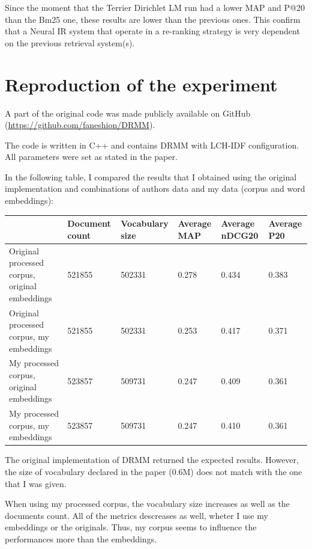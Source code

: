 Since the moment that the Terrier Dirichlet LM run had a lower MAP and P@20 than the Bm25 one, these results are lower than the previous ones. This confirm that a Neural IR system that operate in a re-ranking strategy is very dependent on the previous retrieval system(s).

\section{Reproduction of the experiment}

A part of the original code was made publicly available on GitHub (\url{https://github.com/faneshion/DRMM}).

The code is written in C++ and contains DRMM with LCH-IDF configuration. All parameters were set as stated in the paper.

In the following table, I compared the results that I obtained using the original implementation and combinations of authors data and my data (corpus and word embeddings):

\begin{adjustbox}{center, caption={Replication of the original experiments (extended with my data)}, nofloat=table}
\centering
\begin{tabular}{p{5cm}p{1.7cm}p{2cm}p{1.3cm}p{1.3cm}p{1.3cm}} 
 \hline
 & Document count & Vocabulary size & Average MAP & Average nDCG\@20 & Average P\@20 \\
 \hline
 Original processed corpus, original embeddings & 521855 & 502331 & 0.278 & 0.434 & 0.383 \\ 
 Original processed corpus, my embeddings & 521855 & 502331 & 0.253 & 0.417 & 0.371 \\
 My processed corpus, original embeddings & 523857 & 509731 & 0.247 & 0.409 & 0.361 \\
 My processed corpus, my embeddings & 523857 & 509731 & 0.247 & 0.410 & 0.361 \\
 \hline
\end{tabular}
\end{adjustbox}

The original implementation of DRMM returned the expected results. However, the size of vocabulary declared in the paper (0.6M) does not match with the one that I was given.

When using my processed corpus, the vocabulary size increases as well as the documents count. All of the metrics descreases as well, wheter I use my embeddings or the originals. Thus, my corpus seems to influence the performances more than the embeddings.


